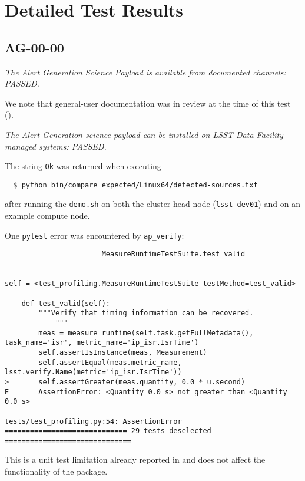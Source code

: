 \documentclass[DM,lsstdraft,STR,toc]{lsstdoc}
\begin{document}
\section{Detailed Test Results}
\label{sect:detailed}

\subsection{AG-00-00}
\label{sect:ag-00-00}

\textit{The Alert Generation Science Payload is available from documented channels: PASSED.}

We note that general-user documentation was in review at the time of this test ().

\textit{The Alert Generation science payload can be installed on LSST Data Facility-managed systems: PASSED.}

The string \texttt{Ok} was returned when executing

\begin{verbatim}
  $ python bin/compare expected/Linux64/detected-sources.txt
\end{verbatim}

after running the \texttt{demo.sh} on both the cluster head node (\texttt{lsst-dev01}) and on an example compute node.

One \texttt{pytest} error was encountered by \texttt{ap\_verify}:

\begin{verbatim}
______________________ MeasureRuntimeTestSuite.test_valid ______________________

self = <test_profiling.MeasureRuntimeTestSuite testMethod=test_valid>

    def test_valid(self):
        """Verify that timing information can be recovered.
            """
        meas = measure_runtime(self.task.getFullMetadata(), task_name='isr', metric_name='ip_isr.IsrTime')
        self.assertIsInstance(meas, Measurement)
        self.assertEqual(meas.metric_name, lsst.verify.Name(metric='ip_isr.IsrTime'))
>       self.assertGreater(meas.quantity, 0.0 * u.second)
E       AssertionError: <Quantity 0.0 s> not greater than <Quantity 0.0 s>

tests/test_profiling.py:54: AssertionError
============================= 29 tests deselected ==============================\end{verbatim}

This is a unit test limitation already reported in  and does not affect the functionality of the package.
\end{document}

